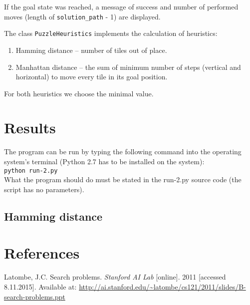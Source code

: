 \documentclass{article}
\begin{document}
If the goal state was reached, a message of success and number of performed moves (length of \texttt{solution\_path} - 1) are displayed. 

The class \texttt{PuzzleHeuristics} implements the calculation of heuristics:
\begin{enumerate}
\item Hamming distance -- number of tiles out of place.
\item Manhattan distance -- the sum of minimum number of steps (vertical and horizontal) to move every tile in its goal position.
\end{enumerate}
For both heuristics we choose the minimal value. 

\section{Results}
The program can be run by typing the following command into the operating system's terminal (Python 2.7 has to be installed on the system): \\ 
\verb|python run-2.py| \\
What the program should do must be stated in the run-2.py source code (the script has no parameters).

\subsection{Hamming distance}



\section{References}

Latombe, J.C. Search problems. \textit{Stanford AI Lab} [online]. 2011 [accessed 8.11.2015]. Available at: \url{http://ai.stanford.edu/~latombe/cs121/2011/slides/B-search-problems.ppt}
\end{document}
